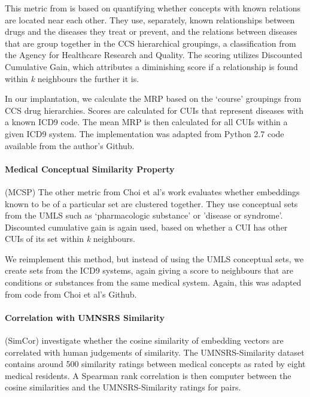 \documentclass[10pt]{article}
\begin{document}
This metric from \cite{choiLearningLowDimensionalRepresentations2016} is based on quantifying whether concepts with known relations are located near each other. They use, separately, known relationships between drugs and the diseases they treat or prevent, and the relations between diseases that are group together in the CCS hierarchical groupings, a classification from the Agency for Healthcare Research and Quality. The scoring utilizes Discounted Cumulative Gain, which attributes a diminishing score if a relationship is found within \emph{k} neighbours the further it is. 

In our implantation, we calculate the MRP based on the `course' groupings from CCS drug hierarchies. Scores are calculated for CUIs that represent diseases with a known ICD9 code. The mean MRP is then calculated for all CUIs within a given ICD9 system. The implementation was adapted from Python 2.7 code available from the author's Github.


\paragraph{Medical Conceptual Similarity Property}(MCSP) The other metric from Choi et al's work evaluates whether embeddings known to be of a particular set are clustered together. They use conceptual sets from the UMLS such as `pharmacologic substance' or 'disease or syndrome'.  Discounted cumulative gain is again used, based on whether a CUI has other CUIs of its set within \emph{k} neighbours. 

We reimplement this method, but instead of using the UMLS conceptual sets, we create sets from the ICD9 systems, again giving a score to neighbours that are conditions or substances from the same medical system. Again, this was adapted from code from Choi et al's Github.  

\paragraph{Correlation with UMNSRS Similarity}(SimCor)
\cite{yuRetrofittingConceptVector2017} investigate whether the cosine similarity of embedding vectors are correlated with human judgements of similarity. The UMNSRS-Similarity dataset \cite{pakhomovSemanticRelatednessSimilarity2018} contains around 500 similarity ratings between medical concepts as rated by eight medical residents. A Spearman rank correlation is then computer between the cosine similarities and the UMNSRS-Similarity ratings for pairs. 
\end{document}
